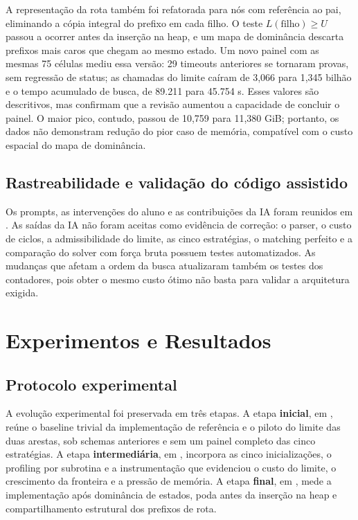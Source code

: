 \documentclass[12pt]{article}
\begin{document}
A representação da rota também foi refatorada para nós com referência ao pai,
eliminando a cópia integral do prefixo em cada filho. O teste
$L(\text{filho})\geq U$ passou a ocorrer antes da inserção na heap, e um mapa de
dominância descarta prefixos mais caros que chegam ao mesmo estado. Um novo
painel com as mesmas 75 células mediu essa versão: 29 timeouts anteriores se
tornaram provas, sem regressão de status; as chamadas do limite caíram de
3,066 para 1,345 bilhão e o tempo acumulado de busca, de 89.211 para 45.754 s.
Esses valores são descritivos, mas confirmam que a revisão aumentou a capacidade
de concluir o painel. O maior pico, contudo, passou de 10,759 para 11,380 GiB;
portanto, os dados não demonstram redução do pior caso de memória, compatível
com o custo espacial do mapa de dominância.

\subsection{Rastreabilidade e validação do código assistido}

Os prompts, as intervenções do aluno e as contribuições da IA foram reunidos em
. As saídas da IA não foram aceitas
como evidência de correção: o parser, o custo de ciclos, a
admissibilidade do limite, as cinco estratégias, o matching perfeito e a
comparação do solver com força bruta possuem testes automatizados. As mudanças
que afetam a ordem da busca atualizaram também os testes dos contadores, pois
obter o mesmo custo ótimo não basta para validar a arquitetura exigida.

\section{Experimentos e Resultados}

\subsection{Protocolo experimental}

A evolução experimental foi preservada em três etapas. A etapa
\textbf{inicial}, em , reúne o baseline
trivial da implementação de referência e o piloto do limite das duas arestas,
sob schemas anteriores e sem um painel completo das cinco estratégias. A etapa
\textbf{intermediária}, em , incorpora
as cinco inicializações, o profiling por subrotina e a instrumentação que
evidenciou o custo do limite, o crescimento da fronteira e a pressão de memória.
A etapa \textbf{final}, em , mede a
implementação após dominância de estados, poda antes da inserção na heap e
compartilhamento estrutural dos prefixos de rota.
\end{document}
